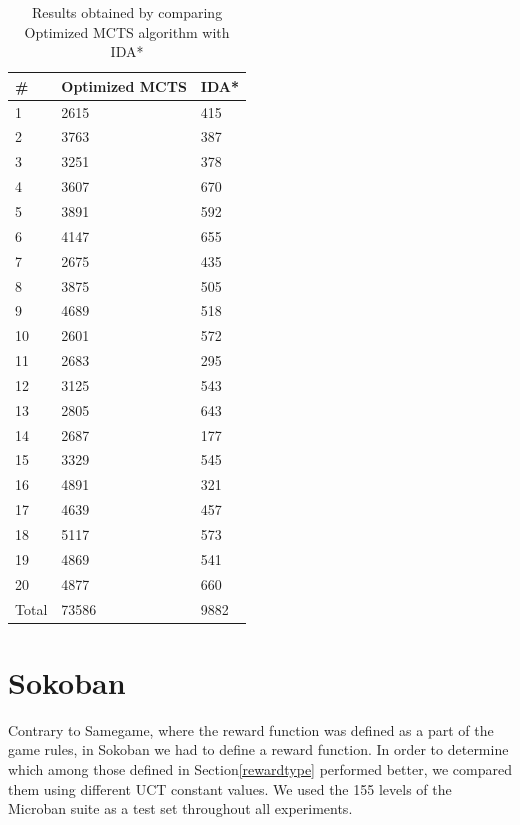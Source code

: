 \begin{table}[!h]
    \centering
    \begin{tabular}{ l | l | l }
          \# & Optimized MCTS & IDA* \\
          \hline			
          1 & 2615 & 415 \\
          2 & 3763 & 387 \\
          3 & 3251 & 378 \\
          4 & 3607 & 670 \\
          5 & 3891 & 592 \\
          6 & 4147 & 655 \\
          7 & 2675 & 435 \\
          8 & 3875 & 505 \\
          9 & 4689 & 518 \\
          10 & 2601 & 572 \\
          11 & 2683 & 295 \\
          12 & 3125 & 543 \\
          13 & 2805 & 643 \\
          14 & 2687 & 177 \\
          15 & 3329 & 545 \\
          16 & 4891 & 321 \\
          17 & 4639 & 457 \\
          18 & 5117 & 573 \\
          19 & 4869 & 541 \\
          20 & 4877 & 660 \\
          \hline  
          Total & 73586 & 9882 \\
          \hline 
    \end{tabular}
    \caption[Optimized MCTS versus IDA* in Samegame]{Results obtained by comparing Optimized MCTS algorithm with IDA*}
    \label{tab:samegame_mcts_vs_ida*}
\end{table}
\section{Sokoban}
Contrary to Samegame, where the reward function was defined as a part of the game rules, in Sokoban we had to define a reward function. In order to determine which among those defined in Section\ref{rewardtype} performed better, we compared them using different UCT constant values. We used the 155 levels of the Microban \cite{microban} suite as a test set throughout all experiments.

